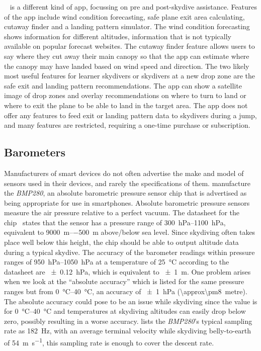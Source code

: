 \documentclass[11pt, a4paper, twocolumn]{article}
\newcommand{\hPa}{\hecto\pascal} %
\begin{document}
~\cite{inc_spot_2017} is a different kind of app, focussing on pre and post-skydive assistance. Features of the app include wind condition forecasting, safe plane exit area calculating, cutaway finder and a landing pattern simulator. The wind condition forecasting shows information for different altitudes, information that is not typically available on popular forecast websites. The cutaway finder feature allows users to say where they cut away their main canopy so that the app can estimate where the canopy may have landed based on wind speed and direction. The two likely most useful features for learner skydivers or skydivers at a new drop zone are the safe exit and landing pattern recommendations. The app can show a satellite image of drop zones and overlay recommendations on where to turn to land or where to exit the plane to be able to land in the target area. The app does not offer any features to feed exit or landing pattern data to skydivers during a jump, and many features are restricted, requiring a one-time purchase or subscription.

\subsection{Barometers}\label{sec:barometers} %

Manufacturers of smart devices do not often advertise the make and model of sensors used in their devices, and rarely the specifications of them. \citeauthor{bosch_bmp280:_2016} manufacture the \textit{BMP280}, an absolute barometric pressure sensor chip that is advertised as being appropriate for use in smartphones. Absolute barometric pressure sensors measure the air pressure relative to a perfect vacuum. The datasheet for the chip~\cite{bosch_bmp280:_2016} states that the sensor has a pressure range of \SIrange{300}{1100}{\hPa}, equivalent to \SIrange{+9000}{-500}{\metre} above/below sea level. Since skydiving often takes place well below this height, the chip should be able to output altitude data during a typical skydive. The accuracy of the barometer readings within pressure ranges of \SIrange{950}{1050}{\hPa} at a temperature of \SI{25}{\degreeCelsius} according to the datasheet are \SI{\pm0.12}{\hPa}, which is equivalent to \SI{\pm1}{\metre}. One problem arises when we look at the ``absolute accuracy'' which is listed for the same pressure ranges but from \SIrange{0}{40}{\degreeCelsius}, an accuracy of \SI{\pm1}{\hPa} (\SI{\approx\pm8}{metre}). The absolute accuracy could pose to be an issue while skydiving since the value is for \SIrange{0}{40}{\degreeCelsius} and temperatures at skydiving altitudes can easily drop below zero, possibly resulting in a worse accuracy. \citeauthor{bosch_bmp280:_2016} lists the \textit{BMP280}'s typical sampling rate as \SI{182}{\Hz}, with an average terminal velocity while skydiving belly-to-earth of \SI{54}{\metre\per\second}, this sampling rate is enough to cover the descent rate.
\end{document}
